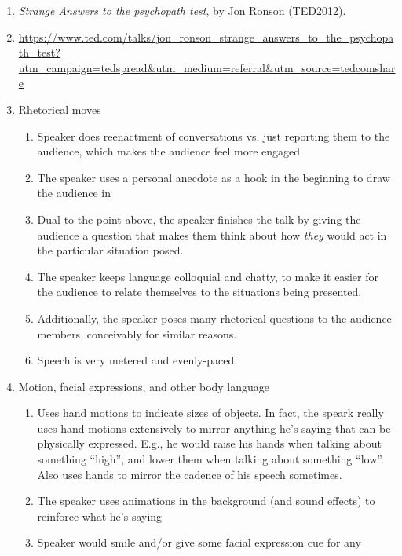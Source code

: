 \documentclass{fkpset}
\begin{document}
\begin{solution}[Answers.]
  \begin{enumerate}[label=\arabic*.]
    \item \emph{Strange Answers to the psychopath test}, by Jon Ronson
      (TED2012).
    \item \url{https://www.ted.com/talks/jon_ronson_strange_answers_to_the_psychopath_test?utm_campaign=tedspread&utm_medium=referral&utm_source=tedcomshare}
    \item Rhetorical moves
      \begin{enumerate}
        \item Speaker does reenactment of conversations vs. just reporting them
          to the audience, which makes the audience feel more engaged
        \item The speaker uses a personal anecdote as a hook in the beginning to
          draw the audience in
        \item Dual to the point above, the speaker finishes the talk by giving
          the audience a question that makes them think about how \emph{they}
          would act in the particular situation posed.
        \item The speaker keeps language colloquial and chatty, to make it
          easier for the audience to relate themselves to the situations being
          presented.
        \item Additionally, the speaker poses many rhetorical questions to the
          audience members, conceivably for similar reasons.
        \item Speech is very metered and evenly-paced.
      \end{enumerate}
    \item Motion, facial expressions, and other body language
      \begin{enumerate}
        \item Uses hand motions to indicate sizes of objects. In fact, the
          speark really uses hand motions extensively to mirror anything he's
          saying that can be physically expressed. E.g., he would raise his
          hands when talking about something ``high'', and lower them when
          talking about something ``low''. Also uses hands to mirror the cadence
          of his speech sometimes.
        \item The speaker uses animations in the background (and sound effects)
          to reinforce what he's saying
        \item Speaker would smile and/or give some facial expression cue for any

\end{enumerate}
\end{enumerate}
\end{solution}
\end{document}
